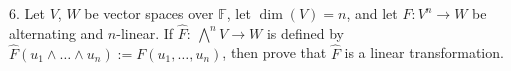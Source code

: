 \documentclass[12pt]{article} %
\newcommand{\F}{\mathbb{F}}
\newcommand{\hatF}{{\widehat{F}}}
\begin{document}
\begin{flushleft}
\vspace{.5cm}

6.  Let $V$, $W$ be vector spaces over $\F$, let $\dim(V) = n$, and let $F: V^n \rightarrow W$ be alternating and $n$-linear.  If $\hatF: \ \bigwedge^n V \rightarrow W$ is defined by $\hatF(u_1 \wedge \dots \wedge u_n) := F(u_1, \dots, u_n)$, then prove that $\hatF$ is a linear transformation.\\


 



 
\end{flushleft}
\end{document}
